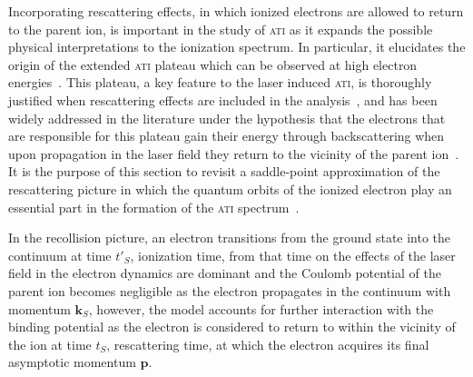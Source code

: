 Incorporating rescattering effects, in which ionized electrons are
allowed to return to the parent ion, is important in the study of
\textsc{ati} as it expands the possible physical interpretations to
the ionization spectrum. In particular, it elucidates the origin of
the extended \textsc{ati} plateau which can be observed at high
electron energies~\cite{Walker_1996}. This plateau, a key feature to
the laser induced \textsc{ati}, is thoroughly justified when
rescattering effects are included in the
analysis~\cite{Paulus_1994plateau,BeckerRescattering_2018}, and has
been widely addressed in the literature under the hypothesis that the
electrons that are responsible for this plateau gain their energy
through backscattering when upon propagation in the laser field they
return to the vicinity of the parent
ion~\cite{Paulus_1994plateau,Becker_1994plateau_classical,Becker_rescattering1994}. It
is the purpose of this section to revisit a saddle-point approximation
of the rescattering picture in which the quantum orbits of the ionized
electron play an essential part in the formation of the \textsc{ati}
spectrum~\cite{KopoldOptComm2000}.




In the recollision picture, an electron transitions from the ground
state into the continuum at time $t'_{S}$, ionization time, from that
time on the effects of the laser field in the electron dynamics are
dominant and the Coulomb potential of the parent ion becomes
negligible as the electron propagates in the continuum with momentum
$\mathbf{k}_{S}$, however, the model accounts for further interaction
with the binding potential as the electron is considered to return to
within the vicinity of the ion at time $t_{S}$, rescattering time, at
which the electron acquires its final asymptotic momentum
$\mathbf{p}$.

